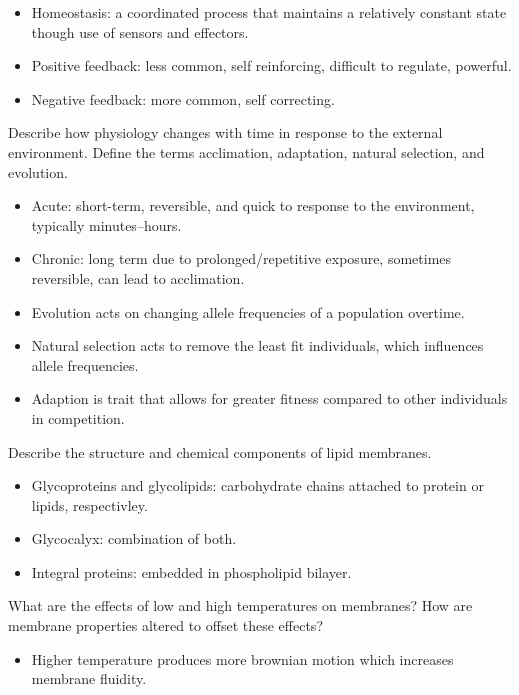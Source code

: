 \documentclass[12pt,a4paper]{article}
\begin{document}
\begin{itemize}
        \begin{itemize}
            \item Homeostasis: a coordinated process that maintains a relatively constant state though use of sensors and effectors.
            \item Positive feedback: less common, self reinforcing, difficult to regulate, powerful.
            \item Negative feedback: more common, self correcting. 
        \end{itemize}
    {\color{G-Moon}\item Describe how physiology changes with time in response to the external environment. Define the terms acclimation, adaptation, natural selection, and evolution.}
        \begin{itemize}
            \item Acute: short-term, reversible, and quick to response to the environment, typically minutes--hours.
            \item Chronic: long term due to prolonged/repetitive exposure, sometimes reversible, can lead to acclimation.
            \item Evolution acts on changing allele frequencies of a population overtime.
            \item Natural selection acts to remove the least fit individuals, which influences allele frequencies.
            \item Adaption is trait that allows for greater fitness compared to other individuals in competition.
        \end{itemize}
    {\color{G-Moon}\item Describe the structure and chemical components of lipid membranes.}
        \begin{itemize}
            \item Glycoproteins and glycolipids: carbohydrate chains attached to protein or lipids, respectivley.
            \item Glycocalyx: combination of both.
            \item Integral proteins: embedded in phospholipid bilayer.
        \end{itemize}
    {\color{G-Moon}\item What are the effects of low and high temperatures on membranes? How are membrane properties altered to offset these effects?}
        \begin{itemize}
            \item Higher temperature produces more brownian motion which increases membrane fluidity. 

\end{itemize}
\end{itemize}
\end{document}
